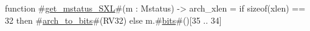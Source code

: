 function #\hyperref[sailRISCVzgetzymstatuszySXL]{get\_mstatus\_SXL}#(m : Mstatus) -> arch_xlen = {
  if   sizeof(xlen) == 32
  then #\hyperref[sailRISCVzarchzytozybits]{arch\_to\_bits}#(RV32)
  else m.#\hyperref[sailRISCVzbits]{bits}#()[35 .. 34]
}
